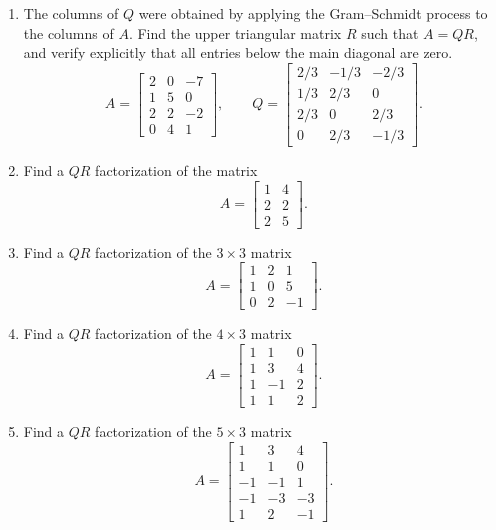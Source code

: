 \documentclass[11pt, letterpaper]{article}
\theoremstyle{definition}
\theoremstyle{remark}
\begin{document}
\begin{enumerate}[label=\textbf{Problem \arabic*.}, leftmargin=*, itemsep=0.9em]
    \item The columns of $Q$ were obtained by applying the Gram--Schmidt process to the columns of $A$. Find the upper triangular matrix $R$ such that $A = QR$, and verify explicitly that all entries below the main diagonal are zero.
    \[
        A = \begin{bmatrix}
            2 & 0 & -7 \\
            1 & 5 & 0 \\
            2 & 2 & -2 \\
            0 & 4 & 1
        \end{bmatrix}, \qquad
        Q = \begin{bmatrix}
            2/3 & -1/3 & -2/3 \\
            1/3 & 2/3 & 0 \\
            2/3 & 0 & 2/3 \\
            0 & 2/3 & -1/3
        \end{bmatrix}.
    \]

    \item Find a $QR$ factorization of the matrix
    \[
        A = \begin{bmatrix}
            1 & 4 \\
            2 & 2 \\
            2 & 5
        \end{bmatrix}.
    \]

    \item Find a $QR$ factorization of the $3 \times 3$ matrix
    \[
        A = \begin{bmatrix}
            1 & 2 & 1 \\
            1 & 0 & 5 \\
            0 & 2 & -1
        \end{bmatrix}.
    \]

    \item Find a $QR$ factorization of the $4 \times 3$ matrix
    \[
        A = \begin{bmatrix}
            1 & 1 & 0 \\
            1 & 3 & 4 \\
            1 & -1 & 2 \\
            1 & 1 & 2
        \end{bmatrix}.
    \]

    \item Find a $QR$ factorization of the $5 \times 3$ matrix
    \[
        A = \begin{bmatrix}
            1 & 3 & 4 \\
            1 & 1 & 0 \\
            -1 & -1 & 1 \\
            -1 & -3 & -3 \\
            1 & 2 & -1
        \end{bmatrix}.
    \]


\end{enumerate}
\end{document}
